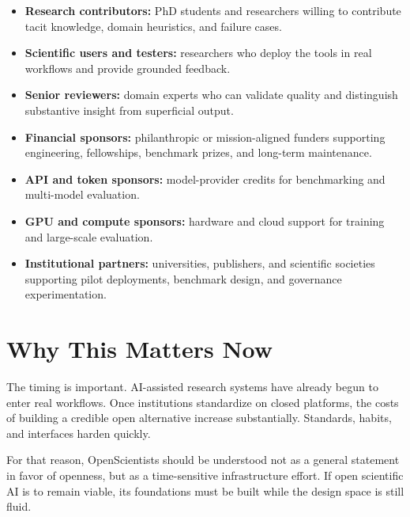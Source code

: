 \documentclass[11pt]{article}
\begin{document}
\begin{itemize}
    \item \textbf{Research contributors:} PhD students and researchers willing to contribute tacit knowledge, domain heuristics, and failure cases.
    \item \textbf{Scientific users and testers:} researchers who deploy the tools in real workflows and provide grounded feedback.
    \item \textbf{Senior reviewers:} domain experts who can validate quality and distinguish substantive insight from superficial output.
    \item \textbf{Financial sponsors:} philanthropic or mission-aligned funders supporting engineering, fellowships, benchmark prizes, and long-term maintenance.
    \item \textbf{API and token sponsors:} model-provider credits for benchmarking and multi-model evaluation.
    \item \textbf{GPU and compute sponsors:} hardware and cloud support for training and large-scale evaluation.
    \item \textbf{Institutional partners:} universities, publishers, and scientific societies supporting pilot deployments, benchmark design, and governance experimentation.
\end{itemize}

\section{Why This Matters Now}
The timing is important. AI-assisted research systems have already begun to enter real workflows. Once institutions standardize on closed platforms, the costs of building a credible open alternative increase substantially. Standards, habits, and interfaces harden quickly.

For that reason, OpenScientists should be understood not as a general statement in favor of openness, but as a time-sensitive infrastructure effort. If open scientific AI is to remain viable, its foundations must be built while the design space is still fluid.
\end{document}
